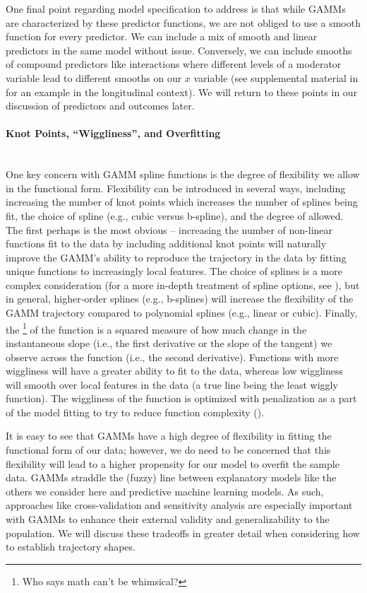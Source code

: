 \documentclass[11pt]{article}
\newcommand{\subsubsubsection}[1]{\paragraph{#1}\mbox{}\\}  %
\begin{document}
One final point regarding model specification to address is that while GAMMs are characterized by these predictor functions, we are not obliged to use a smooth function for every predictor. We can include a mix of smooth and linear predictors in the same model without issue. Conversely, we can include smooths of compound predictors like interactions where different levels of a moderator variable lead to different smooths on our $x$ variable (see supplemental material in \cite{mccormick_longitudinal_2021} for an example in the longitudinal context). We will return to these points in our discussion of predictors and outcomes later.

\subsubsubsection{Knot Points, “Wiggliness”, and Overfitting}
One key concern with GAMM spline functions is the degree of flexibility we allow in the functional form. Flexibility can be introduced in several ways, including increasing the number of knot points which increases the number of splines being fit, the choice of spline (e.g., cubic versus b-spline), and the degree of  allowed. The first perhaps is the most obvious -- increasing the number of non-linear functions fit to the data by including additional knot points will naturally improve the GAMM’s ability to reproduce the trajectory in the data by fitting unique functions to increasingly local features. The choice of splines is a more complex consideration (for a more in-depth treatment of spline options, see \cite{perperoglou_review_2019}), but in general, higher-order splines (e.g., b-splines) will increase the flexibility of the GAMM trajectory compared to polynomial splines (e.g., linear or cubic). Finally, the \footnote{Who says math can’t be whimsical?} of the function is a squared measure of how much change in the instantaneous slope (i.e., the first derivative or the slope of the tangent) we observe across the function (i.e., the second derivative). Functions with more wiggliness will have a greater ability to fit to the data, whereas low wiggliness will smooth over local features in the data (a true line being the least wiggly function). The wiggliness of the function is optimized with penalization as a part of the model fitting to try to reduce function complexity (\cite{wood_stable_2004,wood_fast_2011}).

It is easy to see that GAMMs have a high degree of flexibility in fitting the functional form of our data; however, we do need to be concerned that this flexibility will lead to a higher propensity for our model to overfit the sample data. GAMMs straddle the (fuzzy) line between explanatory models like the others we consider here and predictive machine learning models. As such, approaches like cross-validation and sensitivity analysis are especially important with GAMMs to enhance their external validity and generalizability to the population. We will discuss these tradeoffs in greater detail when considering how to establish trajectory shapes.
\end{document}
